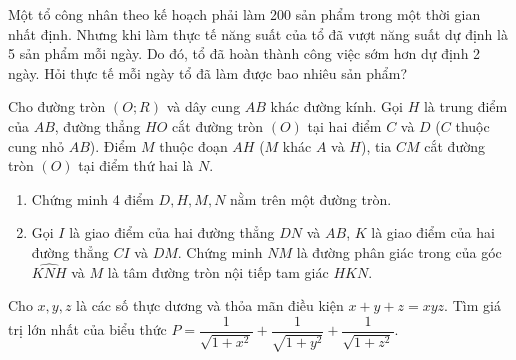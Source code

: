 \begin{ex}
	Một tổ công nhân theo kế hoạch phải làm 200 sản phẩm trong một thời gian nhất định. Nhưng khi làm thực tế năng suất của tổ đã vượt năng suất dự định là 5 sản phẩm mỗi ngày. Do đó, tổ đã hoàn thành công việc sớm hơn dự định 2 ngày. Hỏi thực tế mỗi ngày tổ đã làm được bao nhiêu sản phẩm?
\end{ex}
\begin{ex}
	Cho đường tròn $(O; R)$ và dây cung $AB$ khác đường kính. Gọi $H$ là trung điểm của $AB$, đường thẳng $HO$ cắt đường tròn $(O)$ tại hai điểm $C$ và $D$ ($C$ thuộc cung nhỏ $AB$). Điểm $M$ thuộc đoạn $AH$ ($M$ khác $A$ và $H$), tia $CM$ cắt đường tròn $(O)$ tại điểm thứ hai là $N$.
	\begin{enumerate}
		\item[a)] Chứng minh 4 điểm $D, H, M, N$ nằm trên một đường tròn.
		\item[b)] Gọi $I$ là giao điểm của hai đường thẳng $DN$ và $AB$, $K$ là giao điểm của hai đường thẳng $CI$ và $DM$. Chứng minh $NM$ là đường phân giác trong của góc $\widehat{KNH}$ và $M$ là tâm đường tròn nội tiếp tam giác $HKN$.
	\end{enumerate}
\end{ex}

\begin{ex}
	Cho $x, y, z$ là các số thực dương và thỏa mãn điều kiện $x+y+z = xyz$. Tìm giá trị lớn nhất của biểu thức $P = \dfrac{1}{\sqrt{1+x^2}} + \dfrac{1}{\sqrt{1+y^2}} + \dfrac{1}{\sqrt{1+z^2}}$.
\end{ex}

